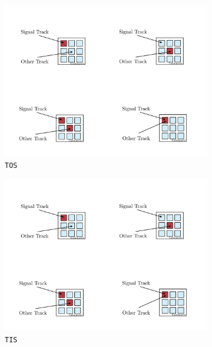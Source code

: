\begin{figure}[!h]
    \centering
    \begin{subfigure}[t]{0.4\textwidth}
        \includegraphics[width=1.0\textwidth]{figs/Selection/Tos.pdf}
        \caption{\texttt{TOS}}
    \end{subfigure}%
    \begin{subfigure}[t]{0.4\textwidth}
        \includegraphics[width=1.0\textwidth]{figs/Selection/Tos.pdf}
        \caption{\texttt{TIS}}
    \end{subfigure}\\
    \begin{subfigure}[t]{0.4\textwidth}

\end{subfigure}
\end{figure}
